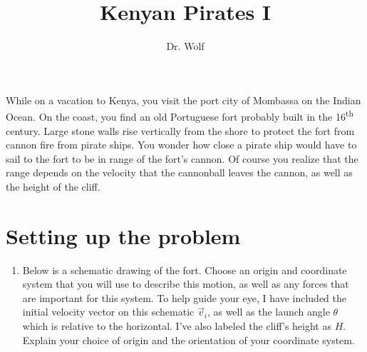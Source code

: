 \documentclass{article}   	%
\title{Kenyan Pirates \textrm{I}}
\author{Dr. Wolf}
\begin{document}

\begin{tcolorbox}[colback=black!5!white,colframe=white!15!black,title=Problem Context]
  While on a vacation to Kenya, you visit the port city of Mombassa on the Indian Ocean. On the
  coast, you find an old Portuguese fort probably built in the 16\textsuperscript{th}
  century. Large stone walls rise vertically from the shore to protect the fort from cannon
  fire from pirate ships.  You wonder how close a pirate ship would have to sail to the fort to
  be in range of the fort's cannon. Of course you realize that the range depends on the
  velocity that the cannonball leaves the cannon, as well as the height of the cliff.
\end{tcolorbox}

\section{Setting up the problem}
\begin{enumerate}
  \item Below is a schematic drawing of the fort. Choose an origin and coordinate system that
  you will use to describe this motion, as well as any forces that are important for this
  system. To help guide your eye, I have included the initial velocity vector on this schematic
  $\vec{v}_i$, as well as the launch angle $\theta$ which is relative to the horizontal. I've
  also labeled the cliff's height as $H$.
  Explain your choice of origin and the orientation of your coordinate system.
\end{enumerate}

\hspace{0.5in}
\end{document}
